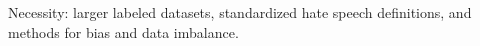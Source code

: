 Necessity: larger labeled datasets, standardized hate speech definitions, and methods for bias and data imbalance.